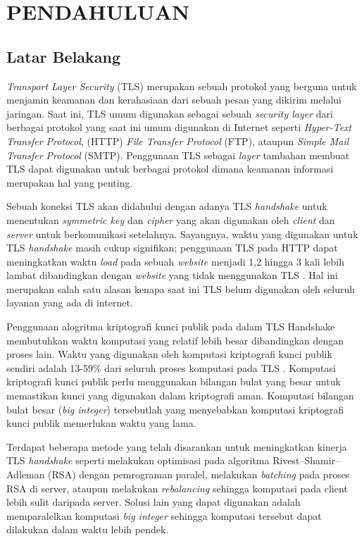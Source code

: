 \chapter{PENDAHULUAN}


  \section{Latar Belakang}
    \textit{Transport Layer Security} (TLS) merupakan sebuah protokol yang berguna untuk menjamin keamanan dan kerahasiaan dari sebuah pesan yang dikirim melalui jaringan. Saat ini, TLS umum digunakan sebagai sebuah \textit{security layer} dari berbagai protokol yang saat ini umum digunakan di Internet seperti \textit{Hyper-Text Transfer Protocol}, (HTTP) \textit{File Transfer Protocol} (FTP), ataupun \textit{Simple Mail Transfer Protocol} (SMTP). Penggunaan TLS sebagai \textit{layer} tambahan membuat TLS dapat digunakan untuk berbagai protokol dimana keamanan informasi merupakan hal yang penting.

    Sebuah koneksi TLS akan didahului dengan adanya TLS \textit{handshake} untuk menentukan \textit{symmetric key} dan \textit{cipher} yang akan digunakan oleh \textit{client} dan \textit{server} untuk berkomunikasi setelahnya. Sayangnya, waktu yang digunakan untuk TLS \textit{handshake} masih cukup signifikan; penggunaan TLS pada HTTP dapat meningkatkan waktu \textit{load} pada sebuah \textit{website} menjadi 1,2 hingga 3 kali lebih lambat dibandingkan dengan \textit{website} yang tidak menggunakan TLS \citep{cost_of_s}. Hal ini merupakan salah satu alasan kenapa saat ini TLS belum digunakan oleh seluruh layanan yang ada di internet.

    Penggunaan alogritma kriptografi kunci publik pada dalam TLS Handshake membutuhkan waktu komputasi yang relatif lebih besar dibandingkan dengan proses lain. Waktu yang digunakan oleh komputasi kriptografi kunci publik sendiri adalah 13-59\% dari seluruh proses komputasi pada TLS \citep{perf_tls}. Komputasi kriptografi kunci publik perlu menggunakan bilangan bulat yang besar untuk memastikan kunci yang digunakan dalam kriptografi aman. Komputasi bilangan bulat besar (\textit{big integer}) tersebutlah yang menyebabkan komputasi kriptografi kunci publik  memerlukan waktu yang lama.

    Terdapat beberapa metode yang telah disarankan untuk meningkatkan kinerja TLS \textit{handshake} seperti melakukan optimisasi pada algoritma Rivest–Shamir–Adleman (RSA) dengan pemrograman paralel, melakukan \textit{batching} pada proses RSA di server, ataupun melakukan \textit{rebalancing} sehingga komputasi pada client lebih sulit daripada server. Solusi lain yang dapat digunakan adalah memparalelkan komputasi \textit{big integer} sehingga komputasi tersebut dapat dilakukan dalam waktu lebih pendek.

